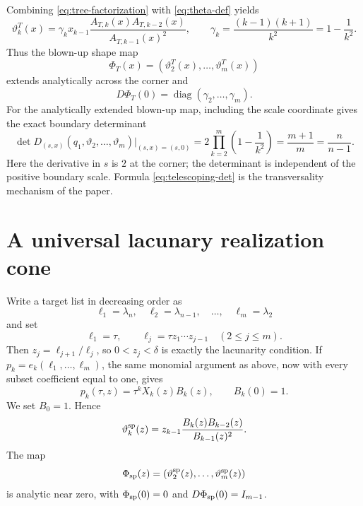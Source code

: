 \documentclass[11pt,reqno]{amsart}
\theoremstyle{definition}
\theoremstyle{remark}
\newcommand{\diag}{\operatorname{diag}}
\begin{document}
Combining \eqref{eq:tree-factorization} with \eqref{eq:theta-def} yields
\begin{equation}\label{eq:tree-theta}
 \vartheta_k^T(x)=
 \gamma_kx_{k-1}
 \frac{A_{T,k}(x)A_{T,k-2}(x)}{A_{T,k-1}(x)^2},
 \qquad
 \gamma_k=\frac{(k-1)(k+1)}{k^2}=1-\frac1{k^2}.
\end{equation}
Thus the blown-up shape map
\[
 \Phi_T(x)=(\vartheta_2^T(x),\ldots,\vartheta_m^T(x))
\]
extends analytically across the corner and
\begin{equation}\label{eq:tree-jacobian}
 D\Phi_T(0)=\diag(\gamma_2,\ldots,\gamma_m).
\end{equation}
For the analytically extended blown-up map, including the scale coordinate
gives the exact boundary determinant
\begin{equation}\label{eq:telescoping-det}
 \det D_{(s,x)}(q_1,\vartheta_2,\ldots,\vartheta_m)\big|_{(s,x)=(s,0)}
 =2\prod_{k=2}^m\left(1-\frac1{k^2}\right)
 =\frac{m+1}{m}=\frac{n}{n-1}.
\end{equation}
Here the derivative in $s$ is $2$ at the corner; the determinant is
independent of the positive boundary scale.  Formula
\eqref{eq:telescoping-det} is the transversality mechanism of the paper.

\section{A universal lacunary realization cone}\label{sec:universal}

Write a target list in decreasing order as
\[
 \ell_1=\lambda_n,\quad \ell_2=\lambda_{n-1},\quad\ldots,\quad
 \ell_m=\lambda_2
\]
and set
\begin{equation}\label{eq:spectral-toric}
 \ell_1=\tau,\qquad
 \ell_j=\tau z_1\cdots z_{j-1}\quad(2\le j\le m).
\end{equation}
Then $z_j=\ell_{j+1}/\ell_j$, so $0<z_j<\delta$ is exactly the
lacunarity condition.  If $p_k=e_k(\ell_1,\ldots,\ell_m)$, the same monomial
argument as above, now with every subset coefficient equal to one, gives
\begin{equation}\label{eq:spectral-factorization}
 p_k(\tau,z)=\tau^kX_k(z)B_k(z),\qquad B_k(0)=1.
\end{equation}
We set $B_0=1$.
Hence
\begin{equation}\label{eq:spectral-theta}
 \vartheta_k^{\rm sp}(z)=
 z_{k-1}\frac{B_k(z)B_{k-2}(z)}{B_{k-1}(z)^2}.
\end{equation}
The map
\[
 \Phi_{\rm sp}(z)=
 (\vartheta_2^{\rm sp}(z),\ldots,\vartheta_m^{\rm sp}(z))
\]
is analytic near zero, with
$\Phi_{\rm sp}(0)=0$ and $D\Phi_{\rm sp}(0)=I_{m-1}$.
\end{document}
